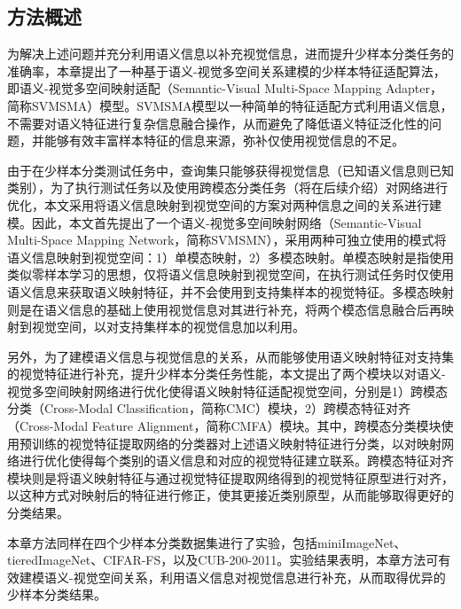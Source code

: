 \subsection[\hspace{-2pt}方法概述]{{\heiti{} \hspace{-8pt}方法概述}}\label{section4: 方法概述}

为解决上述问题并充分利用语义信息以补充视觉信息，进而提升少样本分类任务的准确率，本章提出了一种基于语义-视觉多空间关系建模的少样本特征适配算法，即语义-视觉多空间映射适配（Semantic-Visual Multi-Space Mapping Adapter，简称SVMSMA）模型。SVMSMA模型以一种简单的特征适配方式利用语义信息，不需要对语义特征进行复杂信息融合操作，从而避免了降低语义特征泛化性的问题，并能够有效丰富样本特征的信息来源，弥补仅使用视觉信息的不足。

由于在少样本分类测试任务中，查询集只能够获得视觉信息（已知语义信息则已知类别），为了执行测试任务以及使用跨模态分类任务（将在后续介绍）对网络进行优化，本文采用将语义信息映射到视觉空间的方案对两种信息之间的关系进行建模。因此，本文首先提出了一个语义-视觉多空间映射网络（Semantic-Visual Multi-Space Mapping Network，简称SVMSMN），采用两种可独立使用的模式将语义信息映射到视觉空间：1）单模态映射，2）多模态映射。单模态映射是指使用类似零样本学习的思想，仅将语义信息映射到视觉空间，在执行测试任务时仅使用语义信息来获取语义映射特征，并不会使用到支持集样本的视觉特征。多模态映射则是在语义信息的基础上使用视觉信息对其进行补充，将两个模态信息融合后再映射到视觉空间，以对支持集样本的视觉信息加以利用。

另外，为了建模语义信息与视觉信息的关系，从而能够使用语义映射特征对支持集的视觉特征进行补充，提升少样本分类任务性能，本文提出了两个模块以对语义-视觉多空间映射网络进行优化使得语义映射特征适配视觉空间，分别是1）跨模态分类（Cross-Modal Classification，简称CMC）模块，2）跨模态特征对齐（Cross-Modal Feature Alignment，简称CMFA）模块。其中，跨模态分类模块使用预训练的视觉特征提取网络的分类器对上述语义映射特征进行分类，以对映射网络进行优化使得每个类别的语义信息和对应的视觉特征建立联系。跨模态特征对齐模块则是将语义映射特征与通过视觉特征提取网络得到的视觉特征原型进行对齐，以这种方式对映射后的特征进行修正，使其更接近类别原型，从而能够取得更好的分类结果。

本章方法同样在四个少样本分类数据集进行了实验，包括miniImageNet\cite{vinyals2016matching}、tieredImageNet\cite{ren2018meta}、CIFAR-FS\cite{bertinetto2018meta}，以及CUB-200-2011\cite{wah2011caltech}。实验结果表明，本章方法可有效建模语义-视觉空间关系，利用语义信息对视觉信息进行补充，从而取得优异的少样本分类结果。


